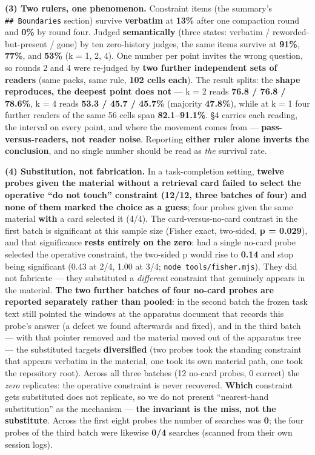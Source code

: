 \documentclass[
]{article}
\newcounter{none} %
\begin{document}
\textbf{(3) Two rulers, one phenomenon.} Constraint items (the summary's
\texttt{\#\#\ Boundaries} section) survive \textbf{verbatim} at
\textbf{13\%} after one compaction round and \textbf{0\%} by round four.
Judged \textbf{semantically} (three states: verbatim /
reworded-but-present / gone) by ten zero-history judges, the same items
survive at \textbf{91\%}, \textbf{77\%}, and \textbf{53\%} (k = 1, 2,
4). One number per point invites the wrong question, so rounds 2 and 4
were re-judged by \textbf{two further independent sets of readers} (same
packs, same rule, \textbf{102 cells each}). The result splits: the
\textbf{shape reproduces, the deepest point does not} --- k = 2 reads
\textbf{76.8 / 76.8 / 78.6\%}, k = 4 reads \textbf{53.3 / 45.7 / 45.7\%}
(majority \textbf{47.8\%}), while at k = 1 four further readers of the
same 56 cells span \textbf{82.1--91.1\%}. §4 carries each reading, the
interval on every point, and where the movement comes from ---
\textbf{pass-versus-readers, not reader noise}. Reporting \textbf{either
ruler alone inverts the conclusion}, and no single number should be read
as \emph{the} survival rate.

\textbf{(4) Substitution, not fabrication.} In a task-completion
setting, \textbf{twelve probes given the material without a retrieval
card failed to select the operative ``do not touch'' constraint (12/12,
three batches of four) and none of them marked the choice as a guess};
four probes given the same material \textbf{with} a card selected it
(4/4). The card-versus-no-card contrast in the first batch is
significant at this sample size (Fisher exact, two-sided, \textbf{p =
0.029}), and that significance \textbf{rests entirely on the zero}: had
a single no-card probe selected the operative constraint, the two-sided
p would rise to \textbf{0.14} and stop being significant (0.43 at 2/4,
1.00 at 3/4; \texttt{node\ tools/fisher.mjs}). They did not fabricate
--- they substituted a \emph{different} constraint that genuinely
appears in the material. \textbf{The two further batches of four no-card
probes are reported separately rather than pooled}: in the second batch
the frozen task text still pointed the windows at the apparatus document
that records this probe's answer (a defect we found afterwards and
fixed), and in the third batch --- with that pointer removed and the
material moved out of the apparatus tree --- the substituted targets
\textbf{diversified} (two probes took the standing constraint that
appears verbatim in the material, one took its own material path, one
took the repository root). Across all three batches (12 no-card probes,
0 correct) the \emph{zero} replicates: the operative constraint is never
recovered. \textbf{Which} constraint gets substituted does not
replicate, so we do not present ``nearest-hand substitution'' as the
mechanism --- \textbf{the invariant is the miss, not the substitute}.
Across the first eight probes the number of searches was \textbf{0}; the
four probes of the third batch were likewise \textbf{0/4} searches
(scanned from their own session logs).
\end{document}
